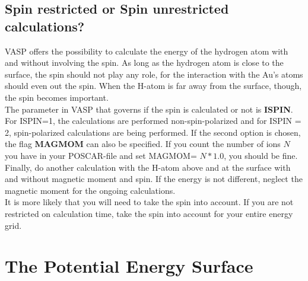 \documentclass[twoside, 11pt, titlepage, captions=nooneline, a4paper, headsepline]{scrbook}%
\begin{document}
\subsection{Spin restricted or Spin unrestricted calculations?}
VASP offers the possibility to calculate the energy of the hydrogen atom with and without involving the spin. As long as the hydrogen atom is close to the surface, the spin should not play any role, for the interaction with the Au's atoms should even out the spin. When the H-atom is far away from the surface, though, the spin becomes important.\\
The parameter in VASP that governs if the spin is calculated or not is \textbf{ISPIN}. For ISPIN=1, the calculations are performed non-spin-polarized and for ISPIN = 2, spin-polarized calculations are being performed. If the second option is chosen, the flag \textbf{MAGMOM} can also be specified. If you count the number of ions $N$ you have in your POSCAR-file and set MAGMOM= $N*1.0$, you should be fine.\\
Finally, do another calculation with the H-atom above and at the surface with and without magnetic moment and spin. If the energy is not different, neglect the magnetic moment for the ongoing calculations.\\
It is more likely that you will need to take the spin into account. If you are not restricted on calculation time, take the spin into account for your entire energy grid.


\section{The Potential Energy Surface}
\end{document}
